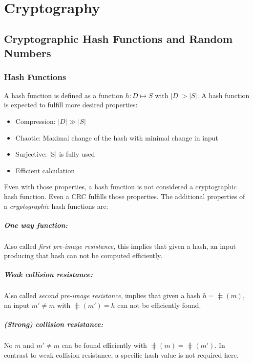 \chapter{Cryptography}
\section{Cryptographic Hash Functions and Random Numbers}
\subsection{Hash Functions}
A hash function is defined as a function $h: D \mapsto S$ with $|D| > |S|$. A
hash function is expected to fulfill more desired properties:
\begin{itemize}
    \item Compression: $|D| \gg |S|$
    \item Chaotic: Maximal change of the hash with minimal change in input
    \item Surjective: |S| is fully used
    \item Efficient calculation
\end{itemize}
Even with those properties, a hash function is not considered a cryptographic
hash function. Even a CRC fulfills those properties. The additional properties
of a \emph{cryptographic} hash functions are:

\paragraph{One way function:} Also called \emph{first pre-image resistance},
    this implies that given a hash, an input producing that hash can not be
    computed efficiently.

\paragraph{Weak collision resistance:} Also called \emph{second pre-image
    resistance}, implies that given a hash $h = \hash(m)$, an input $m' \neq m$
    with $\hash(m') = h$ can not be efficiently found.

\paragraph{(Strong) collision resistance:} No $m$ and $m' \neq m$ can be found
    efficiently with $\hash(m) = \hash(m')$. In contrast to weak collision
    resistance, a specific hash value is not required here.

